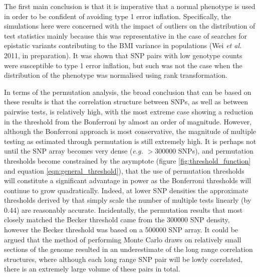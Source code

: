 The first main conclusion is that it is imperative that a normal phenotype is used in order to be confident of avoiding type 1 error inflation. Specifically, the simulations here were concerned with the impact of outliers on the distribution of test statistics mainly because this was representative in the case of searches for epistatic variants contributing to the BMI variance in populations (Wei \emph{et al.} 2011, in preparation). It was shown that SNP pairs with low genotype counts were susceptible to type 1 error inflation, but such was not the case when the distribution of the phenotype was normalised using rank transformation.

In terms of the permutation analysis, the broad conclusion that can be based on these results is that the correlation structure between SNPs, as well as between pairwise tests, is relatively high, with the most extreme case showing a reduction in the threshold from the Bonferroni by almost an order of magnitude. However, although the Bonferroni approach is most conservative, the magnitude of multiple testing as estimated through permutation is still extremely high. It is perhaps not until the SNP array becomes very dense (\emph{e.g.} $>300000$ SNPs), and permutation thresholds become constrained by the asymptote (figure \ref{fig:threshold_function} and equation \ref{eqn:general_threshold}), that the use of permutation thresholds will constitute a significant advantage in power as the Bonferroni thresholds will continue to grow quadratically. Indeed, at lower SNP densities the approximate thresholds derived by \citet{Becker2011} that simply scale the number of multiple tests linearly (by 0.44) are reasonably accurate. Incidentally, the permutation results that most closely matched the Becker threshold came from the 300000 SNP density, however the Becker threshold was based on a 500000 SNP array. It could be argued that the method of performing Monte Carlo draws on relatively small sections of the genome resulted in an underestimate of the long range correlation structures, where although each long range SNP pair will be lowly correlated, there is an extremely large volume of these pairs in total.

